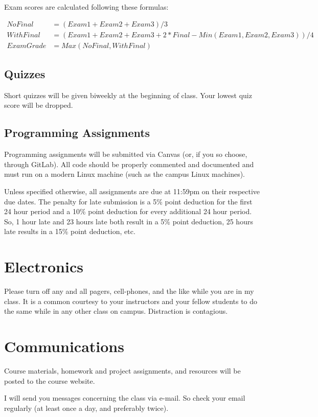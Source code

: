 \documentclass{article}
\begin{document}
Exam scores are calculated following these formulas:

\begin{align*}
	NoFinal &= (Exam1+Exam2+Exam3)/3 \\
	WithFinal &= (Exam1+Exam2+Exam3+2*Final-Min(Exam1,Exam2,Exam3))/4 \\
	ExamGrade &= Max(NoFinal, WithFinal)
\end{align*}

\subsection{Quizzes}
Short quizzes will be given biweekly at the beginning of class.
Your lowest quiz score will be dropped.

\subsection{Programming Assignments}
Programming assignments will be submitted via Canvas (or, if you so choose, through GitLab).
All code should be properly commented and documented and must run on a modern Linux machine (such as the campus Linux machines).

Unless specified otherwise, all assignments are due at 11:59pm on their respective due dates.
The penalty for late submission is a 5\% point deduction for the first 24 hour period and a 10\% point deduction for every additional 24 hour period.
So, 1 hour late and 23 hours late both result in a 5\% point deduction, 25 hours late results in a 15\% point deduction, etc.

\section{Electronics}
Please turn off any and all pagers, cell-phones, and the like while you are in my class.
It is a common courtesy to your instructors and your fellow students to do the same while in any other class on campus.
Distraction is contagious.

\section{Communications}
Course materials, homework and project assignments, and resources will be posted to the course website.

I will send you messages concerning the class via e-mail.
So check your email regularly (at least once a day, and preferably twice).
\end{document}
